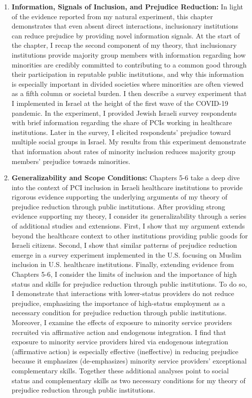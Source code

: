 \documentclass[12pt]{article}
\theoremstyle{plain}
\begin{document}
\begin{enumerate}
\item \textbf{Information, Signals of Inclusion, and Prejudice Reduction:} In light of the evidence reported from my natural experiment, this chapter demonstrates that even absent direct interactions, inclusionary institutions can reduce prejudice by providing novel information signals. At the start of the chapter, I recap the second component of my theory, that inclusionary institutions provide majority group members with information regarding how minorities are credibly committed to contributing to a common good through their participation in reputable public institutions, and why this information is especially important in divided societies where minorities are often viewed as a fifth column or societal burden. I then describe a survey experiment that I implemented in Israel at the height of the first wave of the COVID-19 pandemic. In the experiment, I provided Jewish Israeli survey respondents with brief information regarding the share of PCIs working in healthcare institutions. Later in the survey, I elicited respondents' prejudice toward multiple social groups in Israel. My results from this experiment demonstrate that information about rates of minority inclusion reduces majority group members' prejudice towards minorities. 



\item \textbf{Generalizability and Scope Conditions:} Chapters 5-6 take a deep dive into the context of PCI inclusion in Israeli healthcare institutions to provide rigorous evidence supporting the underlying arguments of my theory of prejudice reduction through public institutions. After providing strong evidence supporting my theory, I consider its generalizability through a series of additional studies and extensions. First, I show that my argument extends beyond the healthcare context to other institutions providing public goods for Israeli citizens. Second, I show that similar patterns of prejudice reduction emerge in a survey experiment implemented in the U.S. focusing on Muslim inclusion in U.S. healthcare institutions. Finally, extending evidence from Chapters 5-6, I consider the limits of inclusion and the importance of high status and skills for prejudice reduction through public institutions. To do so, I demonstrate that interactions with lower-status providers do not reduce prejudice, emphasizing the importance of high-status employment as a necessary condition for prejudice reduction through public institutions. Moreover, I examine the effects of exposure to minority service providers recruited via affirmative action and endogenous integration. I find that exposure to minority service providers hired via endogenous integration (affirmative action) is especially effective (ineffective) in reducing prejudice because it emphasizes (de-emphasizes) minority service providers' exceptional complementary skills. Together these additional analyses point to social status and complementary skills as two necessary conditions for my theory of prejudice reduction through public institutions. 



\end{enumerate}
\end{document}
